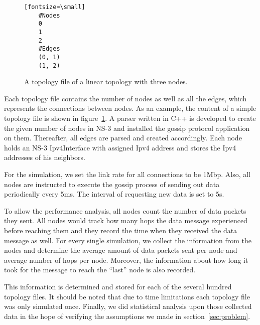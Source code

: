 \begin{figure}
	\centering
	\begin{verbatim}[fontsize=\small]
	#Nodes
	0
	1
	2
	#Edges
	(0, 1)
	(1, 2)
	\end{verbatim}
	\caption{A topology file of a linear topology with three nodes.}
	\label{fig:topsimple}
\end{figure}


Each topology file contains the number of nodes as well as all the edges, which represents the connections between nodes. As an example, the content of a simple topology file is shown in figure~\ref{fig:topsimple}. A parser written in C++ is developed to create the given number of nodes in NS-3 and installed the gossip protocol application on them. Thereafter, all edges are parsed and created accordingly. Each node holds an NS-3 Ipv4Interface with assigned Ipv4 address and stores the Ipv4 addresses of his neighbors.

For the simulation, we set the link rate for all connections to be 1Mbp. Also, all nodes are instructed to execute the gossip process of sending out data periodically every 5ms. The interval of requesting new data is set to 5s.

To allow the performance analysis, all nodes count the number of data packets they sent. All nodes would track how many hops the data message experienced before reaching them and they record the time when they received the data message as well. For every single simulation, we collect the information from the nodes and determine the average amount of data packets sent per node and average number of hops per node. Moreover, the information about how long it took for the message to reach the ``last'' node is also recorded.

This information is determined and stored for each of the several hundred topology files. It should be noted that due to time limitations each topology file was only simulated once. Finally, we did statistical analysis upon those collected data in the hope of verifying the assumptions we made in section~\ref{sec:problem}.

